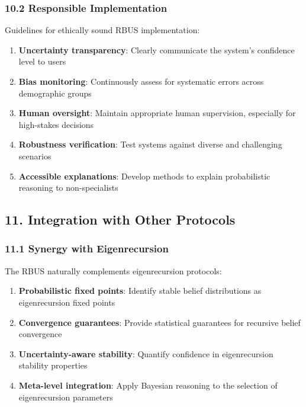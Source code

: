 \documentclass[
]{article}
\providecommand{\tightlist}{%
  \setlength{\itemsep}{0pt}\setlength{\parskip}{0pt}}
\begin{document}
\subsubsection{10.2 Responsible
Implementation}\label{responsible-implementation-1}

Guidelines for ethically sound RBUS implementation:

\begin{enumerate}
\def\labelenumi{\arabic{enumi}.}
\tightlist
\item
  \textbf{Uncertainty transparency}: Clearly communicate the system's
  confidence level to users
\item
  \textbf{Bias monitoring}: Continuously assess for systematic errors
  across demographic groups
\item
  \textbf{Human oversight}: Maintain appropriate human supervision,
  especially for high-stakes decisions
\item
  \textbf{Robustness verification}: Test systems against diverse and
  challenging scenarios
\item
  \textbf{Accessible explanations}: Develop methods to explain
  probabilistic reasoning to non-specialists
\end{enumerate}

\subsection{11. Integration with Other
Protocols}\label{integration-with-other-protocols}

\subsubsection{11.1 Synergy with
Eigenrecursion}\label{synergy-with-eigenrecursion}

The RBUS naturally complements eigenrecursion protocols:

\begin{enumerate}
\def\labelenumi{\arabic{enumi}.}
\tightlist
\item
  \textbf{Probabilistic fixed points}: Identify stable belief
  distributions as eigenrecursion fixed points
\item
  \textbf{Convergence guarantees}: Provide statistical guarantees for
  recursive belief convergence
\item
  \textbf{Uncertainty-aware stability}: Quantify confidence in
  eigenrecursion stability properties
\item
  \textbf{Meta-level integration}: Apply Bayesian reasoning to the
  selection of eigenrecursion parameters
\end{enumerate}
\end{document}
